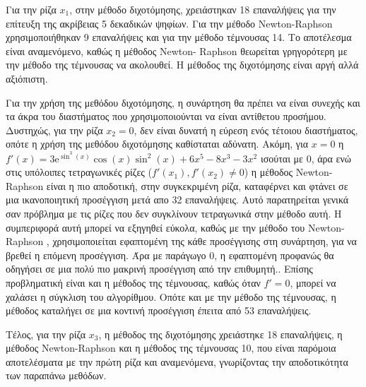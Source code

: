 \documentclass[a4paper,11pt]{article}
\newcommand{\lt}{\latintext}
\newcommand{\gt}{\greektext}
\begin{document}
	\par
 Για την ρίζα $x_{1}$, στην μέθοδο διχοτόμησης, χρειάστηκαν 18 επαναλήψεις
 για την επίτευξη της ακρίβειας 5 δεκαδικών ψηφίων. Για την μέθοδο \lt 
 Newton-Raphson \gt χρησιμοποιήθηκαν 9 επαναλήψεις και για την μέθοδο 
 τέμνουσας 14. Το αποτέλεσμα είναι αναμενόμενο, καθώς η μέθοδος \lt Newton-
 Raphson \gt θεωρείται γρηγορότερη με την μέθοδο της τέμνουσας να ακολουθεί.
 Η μέθοδος της διχοτόμησης είναι αργή αλλά αξιόπιστη.
 \par 
    Για την χρήση της μεθόδου διχοτόμησης, η συνάρτηση θα πρέπει να είναι
    συνεχής και τα άκρα του διαστήματος που χρησιμοποιούνται να είναι 
    αντίθετου προσήμου. Δυστηχώς, για την ρίζα $x_{2}=0$, δεν είναι δυνατή η
    εύρεση ενός τέτοιου διαστήματος, οπότε η χρήση της μεθόδου διχοτόμησης
    καθίσταται αδύνατη. Ακόμη, για $x=0$ η 
$f'(x)=3\mathrm{e}^{\sin^3\left(x\right)}\cos\left(x\right)\sin^2\left(x\right)+6x^5-8x^3-3x^2$ 
ισούται με 0, άρα ενώ στις υπόλοιπες τετραγωνικές ρίζες
($f'(x_{1}),f'(x_{2}) \neq 0$) η μέθοδος \lt Newton-Raphson \gt είναι η πιο
αποδοτική, στην συγκεκριμένη ρίζα, καταφέρνει και φτάνει σε μια 
ικανοποιητική προσέγγιση μετά απο 32 επαναλήψεις. Αυτό παρατηρείται γενικά
σαν πρόβλημα με τις ρίζες που δεν συγκλίνουν τετραγωνικά στην μέθοδο αυτή. 
Η συμπεριφορά αυτή μπορεί να εξηγηθεί εύκολα, καθώς με την μέθοδο του \lt Newton-
Raphson \gt, χρησιμοποιείται εφαπτομένη της κάθε προσέγγισης στη συνάρτηση,
για να βρεθεί η επόμενη προσέγγιση. Άρα με παράγωγο 0, η εφαπτομένη προφανώς
θα οδηγήσει σε μια πολύ πιο μακρινή προσέγγιση από την επιθυμητή.. Επίσης προβληματική είναι και η μέθοδος της 
τέμνουσας, καθώς όταν $f'=0$, μπορεί να χαλάσει η σύγκλιση του αλγορίθμου.
Οπότε και με την μέθοδο της τέμνουσας, η μέθοδος καταλήγει σε μια κοντινή
προσέγγιση έπειτα από 53 επαναλήψεις. \par
    Τέλος, για την ρίζα $x_{3}$, η μέθοδος της διχοτόμησης χρειάστηκε 18 
    επαναλήψεις, η μέθοδος \lt Newton-Raphson  \gt 8 και η μέθοδος της 
    τέμνουσας 10, που είναι παρόμοια αποτελέσματα με την πρώτη ρίζα και 
    αναμενόμενα, γνωρίζοντας την αποδοτικότητα των παραπάνω μεθόδων.
    
    
\end{document}
